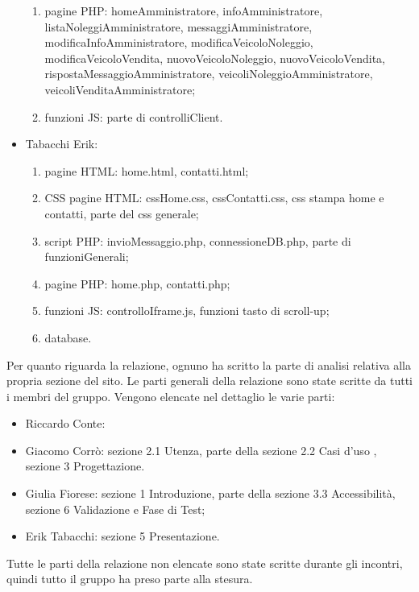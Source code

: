 \begin{itemize}
\begin{enumerate}
            \item pagine PHP: homeAmministratore, infoAmministratore, listaNoleggiAmministratore, messaggiAmministratore, modificaInfoAmministratore, modificaVeicoloNoleggio, modificaVeicoloVendita, nuovoVeicoloNoleggio, nuovoVeicoloVendita, rispostaMessaggioAmministratore, veicoliNoleggioAmministratore, veicoliVenditaAmministratore;
            \item funzioni JS: parte di controlliClient.
        \end{enumerate}
    \item Tabacchi Erik:
        \begin{enumerate}
            \item pagine HTML: home.html, contatti.html;
            \item CSS pagine HTML: cssHome.css, cssContatti.css, css stampa home e contatti, parte del css generale;
            \item script PHP: invioMessaggio.php, connessioneDB.php, parte di funzioniGenerali;
            \item pagine PHP: home.php, contatti.php;
            \item funzioni JS: controlloIframe.js, funzioni tasto di scroll-up;
            \item database.
        \end{enumerate}
\end{itemize}
Per quanto riguarda la relazione, ognuno ha scritto la parte di analisi relativa alla propria sezione del sito. Le parti generali della relazione sono state scritte da tutti i membri del gruppo.
Vengono elencate nel dettaglio le varie parti:
\begin{itemize}
    \item Riccardo Conte:
    \item Giacomo Corrò: sezione 2.1 Utenza, parte della sezione 2.2 Casi d'uso , sezione 3 Progettazione.
    \item Giulia Fiorese: sezione 1 Introduzione, parte della sezione 3.3 Accessibilità, sezione 6 Validazione e Fase di Test;
    \item Erik Tabacchi: sezione 5 Presentazione.
\end{itemize}
Tutte le parti della relazione non elencate sono state scritte durante gli incontri, quindi tutto il gruppo ha preso parte alla stesura.
\pagebreak
